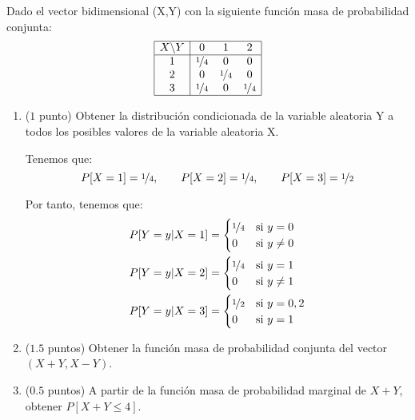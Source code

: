 \documentclass[12pt]{article}
\begin{document}
    \begin{ejercicio}
        Dado el vector bidimensional (X,Y) con la siguiente función masa de probabilidad conjunta:
        \begin{equation*}
            \begin{array}{|c|ccc|}
                \hline
                X\backslash Y & 0 & 1 & 2\\
                \hline
                1 & \nicefrac{1}{4} & 0 & 0\\
                2 & 0 & \nicefrac{1}{4} & 0\\
                3 & \nicefrac{1}{4} & 0 & \nicefrac{1}{4}\\
                \hline
            \end{array}
        \end{equation*}

        \begin{enumerate}
            \item ($1$ punto) Obtener la distribución condicionada de la variable aleatoria Y a todos los posibles valores de la variable aleatoria X.
            
            Tenemos que:
            \begin{equation*}
                P[X=1] = \nicefrac{1}{4},\qquad P[X=2] = \nicefrac{1}{4},\qquad P[X=3] = \nicefrac{1}{2}
            \end{equation*}

            Por tanto, tenemos que:
            \begin{align*}
                P[Y=y|X=1] &= \begin{cases}
                    \nicefrac{1}{4} & \text{si } y=0\\
                    0 & \text{si } y\neq 0
                \end{cases} \\
                P[Y=y|X=2] &= \begin{cases}
                    \nicefrac{1}{4} & \text{si } y=1 \\
                    0 & \text{si } y\neq 1
                \end{cases} \\
                P[Y=y|X=3] &= \begin{cases}
                    \nicefrac{1}{2} & \text{si } y=0,2\\
                    0 & \text{si } y=1
                \end{cases}
            \end{align*}
            \item ($1.5$ puntos) Obtener la función masa de probabilidad conjunta del vector $(X +Y,X -Y)$.
            \item ($0.5$ puntos) A partir de la función masa de probabilidad marginal de $X + Y$, obtener $P[X +Y \leq 4]$.
        \end{enumerate}
    \end{ejercicio}
\end{document}
